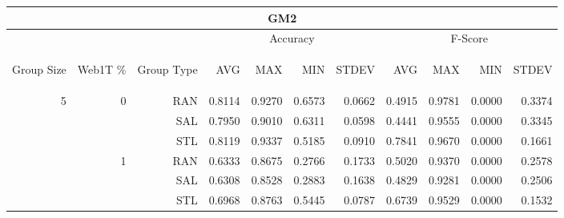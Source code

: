 \begin{center}
\begin{table}[htbp] 
 \begin{center}
\begin{tabular}{ | r | r | r | r | r | r | r | r | r | r | r |}
\hline
\multicolumn{11}{|c|}{GM2}\\
\hline
 & & & \multicolumn{4}{|c|}{Accuracy} & \multicolumn{4}{|c|}{F-Score}\\ \cline{4-11}
\begin{sideways}Group Size\end{sideways} & \begin{sideways}Web1T \%\end{sideways} & \begin{sideways}Group Type\end{sideways} & \begin{sideways}AVG\end{sideways} & \begin{sideways}MAX\end{sideways} & \begin{sideways}MIN\end{sideways} & \begin{sideways}STDEV\end{sideways} & \begin{sideways}AVG\end{sideways} & \begin{sideways}MAX\end{sideways} & \begin{sideways}MIN\end{sideways} & \begin{sideways}STDEV\end{sideways}\\
\hline
\multirow{18}{*}{5}
 & \multirow{3}{*}{0} & RAN & 0.8114 & 0.9270 & 0.6573 & 0.0662 & 0.4915 & 0.9781 & 0.0000 & 0.3374\\ \cline{3-11}
 &   & SAL & 0.7950 & 0.9010 & 0.6311 & 0.0598 & 0.4441 & 0.9555 & 0.0000 & 0.3345\\ \cline{3-11}
 &   & STL & 0.8119 & 0.9337 & 0.5185 & 0.0910 & 0.7841 & 0.9670 & 0.0000 & 0.1661\\ \cline{2-11}
 & \multirow{3}{*}{1} & RAN & 0.6333 & 0.8675 & 0.2766 & 0.1733 & 0.5020 & 0.9370 & 0.0000 & 0.2578\\ \cline{3-11}
 &   & SAL & 0.6308 & 0.8528 & 0.2883 & 0.1638 & 0.4829 & 0.9281 & 0.0000 & 0.2506\\ \cline{3-11}
 &   & STL & 0.6968 & 0.8763 & 0.5445 & 0.0787 & 0.6739 & 0.9529 & 0.0000 & 0.1532\\ \cline{2-11}

\end{tabular}
\end{center}
\end{table}
\end{center}
